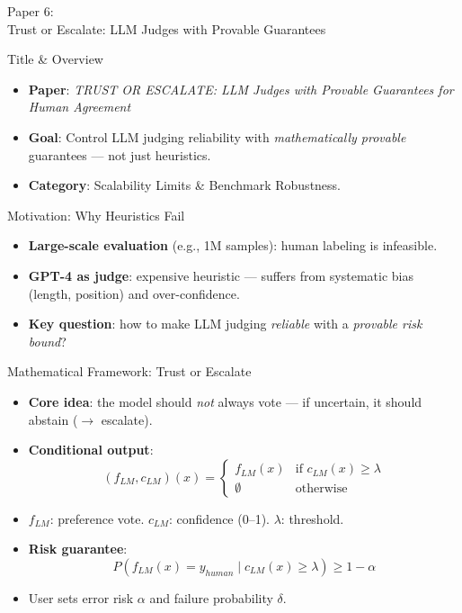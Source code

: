 \documentclass[10pt]{beamer}
\begin{document}
\begin{frame}[standout]
  \hypertarget{paper6}{}
  \Large Paper 6:\\Trust or Escalate: LLM Judges with Provable Guarantees
\end{frame}

\begin{frame}{Title \& Overview}
  \begin{itemize}
    \item \textbf{Paper}: \emph{TRUST OR ESCALATE: LLM Judges with Provable Guarantees for Human Agreement}
    \item \textbf{Goal}: Control LLM judging reliability with \emph{mathematically provable} guarantees --- not just heuristics.
    \item \textbf{Category}: Scalability Limits \& Benchmark Robustness.
  \end{itemize}
\end{frame}

\begin{frame}{Motivation: Why Heuristics Fail}
  \begin{itemize}
    \item \textbf{Large-scale evaluation} (e.g., 1M samples): human labeling is infeasible.
    \item \textbf{GPT-4 as judge}: expensive heuristic --- suffers from systematic bias (length, position) and over-confidence.
    \item \textbf{Key question}: how to make LLM judging \emph{reliable} with a \emph{provable risk bound}?
  \end{itemize}
\end{frame}

\begin{frame}{Mathematical Framework: Trust or Escalate}
  \begin{itemize}
    \item \textbf{Core idea}: the model should \emph{not} always vote --- if uncertain, it should abstain ($ \rightarrow $ escalate).
    \item \textbf{Conditional output}:
    \[
    (f_{LM}, c_{LM})(x) =
    \begin{cases}
      f_{LM}(x) & \text{if } c_{LM}(x) \ge \lambda \\
      \emptyset & \text{otherwise}
    \end{cases}
    \]
    \item $f_{LM}$: preference vote. \; $c_{LM}$: confidence (0--1). \; $\lambda$: threshold.
    \item \textbf{Risk guarantee}:
    \[
    P(f_{LM}(x) = y_{human} \mid c_{LM}(x) \ge \lambda) \ge 1 - \alpha
    \]
    \item User sets error risk $\alpha$ and failure probability $\delta$.
  \end{itemize}
\end{frame}
\end{document}
